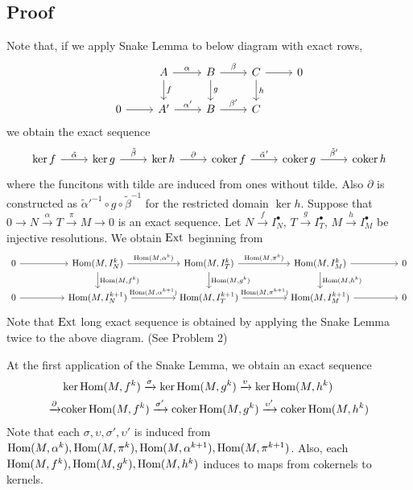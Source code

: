 \subsection*{Proof}



Note that, if we apply Snake Lemma to below diagram with exact rows,
\[\begin{tikzcd}
  & A \ar["f"]{d} \ar["\alpha"]{r} & B \ar["g"]{d} \ar["\beta"]{r} & C \ar["h"]{d} \ar{r} & 0 \\
  0 \ar{r} & A' \ar["\alpha'"]{r} & B \ar["\beta'"]{r} & C &
\end{tikzcd}\]
we obtain the exact sequence
\[\begin{tikzcd}
\ker f \ar["\tilde\alpha"]{r} & \ker g \ar["\tilde\beta"]{r} & \ker h \ar["\partial"]{r} & \coker f \ar["\tilde\alpha'"]{r} & \coker g \ar["\tilde\beta'"]{r} & \coker h
\end{tikzcd}\]
where the funcitons with tilde are induced from ones without tilde.
Also \(\partial\) is constructed as \(\tilde\alpha'^{-1} \circ g \circ \tilde\beta^{-1}\) for the restricted domain \(\ker h\).
\br
\noindent
Suppose that
\(0 \to N \xrightarrow{\alpha} T \xrightarrow{\pi} M \to 0\)
is an exact sequence.
Let
\(N \xrightarrow{f} I_N^\bullet\),
\(T \xrightarrow{g} I_T^\bullet\),
\(M \xrightarrow{h} I_M^\bullet\)
be injective resolutions.
We obtain \(\textnormal{Ext}\) beginning from
\[\begin{tikzcd}[column sep=huge]
  0 \ar{r} & \Hom(M, I_N^k) \ar["\Hom(M{,}f^k)"]{d} \ar["\Hom(M{,}\alpha^k)"]{r} & \Hom(M, I_T^k) \ar["\Hom(M{,}g^k)"]{d} \ar["\Hom(M{,}\pi^k)"]{r} & \Hom(M, I_M^k) \ar["\Hom(M{,}h^k)"]{d} \ar{r} & 0 \\
  0 \ar{r} & \Hom(M, I_N^{k+1}) \ar["\Hom(M{,}\alpha^{k+1})"]{r} & \Hom(M, I_T^{k+1}) \ar["\Hom(M{,}\pi^{k+1})"]{r} & \Hom(M, I_M^{k+1}) \ar{r} & 0
\end{tikzcd}\]
Note that \(\textnormal{Ext}\) long exact sequence is obtained by applying
the Snake Lemma twice to the above diagram. (See Problem 2)

At the first application of the Snake Lemma,
we obtain an exact sequence
\begin{align*}
  &\ker \textnormal{Hom}(M, f^k) \xrightarrow{\sigma}
  \ker \textnormal{Hom}(M, g^k) \xrightarrow{\upsilon}
  \ker \textnormal{Hom}(M, h^k) \\
  \xrightarrow{\partial}
  &\textnormal{coker}\, \textnormal{Hom}(M, f^k) \xrightarrow{\sigma'}
  \textnormal{coker}\, \textnormal{Hom}(M, g^k) \xrightarrow{\upsilon'}
  \textnormal{coker}\, \textnormal{Hom}(M, h^k)
\end{align*}
Note that each \(\sigma, \upsilon, \sigma', \upsilon'\) is induced from
\(\textnormal{Hom}(M, \alpha^k), \textnormal{Hom}(M, \pi^k), \textnormal{Hom}(M, \alpha^{k + 1}), \textnormal{Hom}(M, \pi^{k + 1})\).
Also, each \(\textnormal{Hom}(M, f^k), \textnormal{Hom}(M, g^k), \textnormal{Hom}(M, h^k)\) induces to maps from cokernels to kernels.

